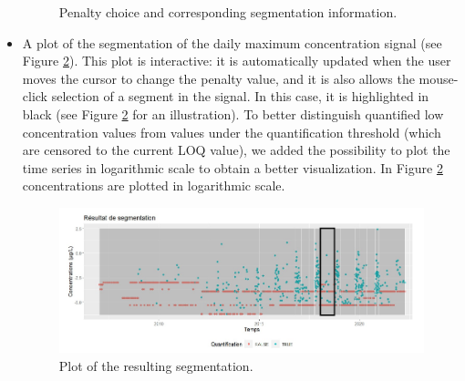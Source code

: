 \begin{itemize}
\begin{figure}[htbp]
  \caption{Penalty choice and corresponding segmentation information.}
  \label{fig:Imapp3}
\end{figure}
\item A plot of the segmentation of the daily maximum concentration signal (see Figure \ref{fig:Imapp4}). This plot is interactive: it is automatically updated when the user moves the cursor to change the penalty value, and it is also allows the mouse-click selection of a segment in the signal. In this case, it is highlighted in black (see Figure \ref{fig:Imapp4} for an illustration). To better distinguish quantified low concentration values from values under the quantification threshold (which are censored to the current LOQ value), we added the possibility to plot the time series in logarithmic scale to obtain a better visualization. In Figure \ref{fig:Imapp4} concentrations are plotted in logarithmic scale.
\begin{figure}[htbp]
  \centering
  \includegraphics[]{figs/Chap6/Im_appbis4.pdf}
  \caption{Plot of the resulting segmentation.}
  \label{fig:Imapp4}
\end{figure}     
\end{itemize}  

